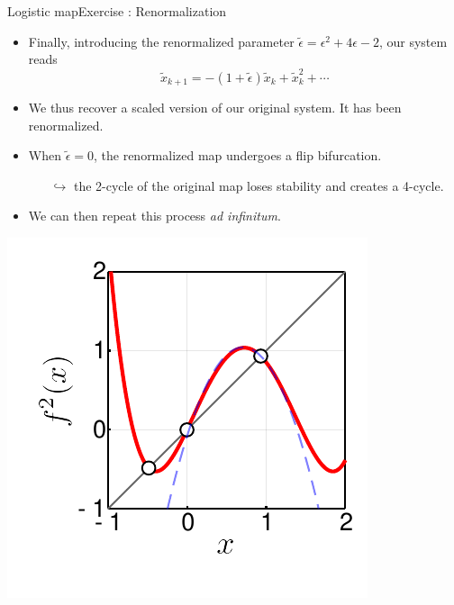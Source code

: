 \documentclass[usenames,dvipsnames,svgnames,10pt,aspectratio=169]{beamer}
\begin{document}
\begin{frame}[t, c]{Logistic map}{Exercise : Renormalization}
	\begin{minipage}{.68\textwidth}
		\begin{itemize}
			\item Finally, introducing the renormalized parameter \( \tilde{\epsilon} = \epsilon^2 + 4\epsilon - 2 \), our system reads
			\[
				\tilde{x}_{k+1} = -\left( 1 + \tilde{\epsilon} \right) \tilde{x}_k + \tilde{x}_k^2 + \cdots
			\]

			\item We thus recover a scaled version of our original system. It has been renormalized.

			\medskip

			\item When \( \tilde{\epsilon} = 0 \), the renormalized map undergoes a flip bifurcation.
			\begin{itemize}
				\item[\( \hookrightarrow \)] the 2-cycle of the original map loses stability and creates a 4-cycle.
			\end{itemize}

			\medskip

			\item We can then repeat this process \emph{ad infinitum}.
		\end{itemize}
	\end{minipage}%
	\hfill
	\begin{minipage}{.28\textwidth}
		\includegraphics[width=\textwidth]{renormalization_2_cycle}
	\end{minipage}

	\vspace{1cm}
\end{frame}
\end{document}
